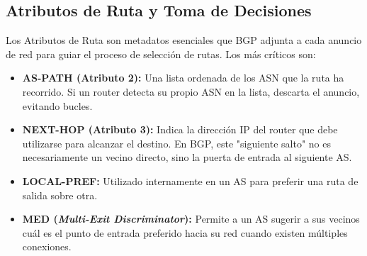 \subsection{Atributos de Ruta y Toma de Decisiones}

Los Atributos de Ruta son metadatos esenciales que BGP adjunta a cada anuncio de red para guiar el proceso de selección de rutas. Los más críticos son:

\begin{itemize}
	\item \textbf{AS-PATH (Atributo 2):} Una lista ordenada de los ASN que la ruta ha recorrido. Si un router detecta su propio ASN en la lista, descarta el anuncio, evitando bucles.
	\item \textbf{NEXT-HOP (Atributo 3):} Indica la dirección IP del router que debe utilizarse para alcanzar el destino. En BGP, este "siguiente salto" no es necesariamente un vecino directo, sino la puerta de entrada al siguiente AS.
	\item \textbf{LOCAL-PREF:} Utilizado internamente en un AS para preferir una ruta de salida sobre otra.
	\item \textbf{MED (\textit{Multi-Exit Discriminator}):} Permite a un AS sugerir a sus vecinos cuál es el punto de entrada preferido hacia su red cuando existen múltiples conexiones.
\end{itemize}
